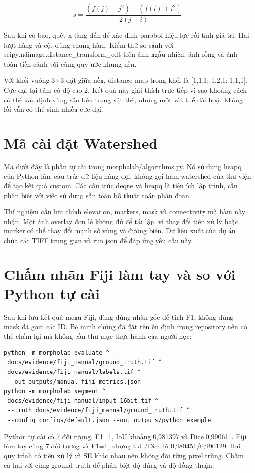 \documentclass[12pt,a4paper,oneside]{report}
\begin{document}
\begin{equation}s=\frac{(f(j)+j^2)-(f(i)+i^2)}{2(j-i)}\end{equation}



Sau khi có bao, quét x tăng dần để xác định parabol hiệu lực rồi tính giá trị. Hai lượt hàng và cột dùng chung hàm. Kiểm thử so sánh với scipy.ndimage.distance\_transform\_edt trên ảnh ngẫu nhiên, ảnh rỗng và ảnh toàn tiền cảnh với cùng quy ước khung nền.

Với khối vuông 3\ensuremath{\times}3 đặt giữa nền, distance map trong khối là [1,1,1; 1,2,1; 1,1,1]. Cực đại tại tâm có độ cao 2. Kết quả này giải thích trực tiếp vì sao khoảng cách có thể xác định vùng sâu bên trong vật thể, nhưng một vật thể dài hoặc không lồi vẫn có thể sinh nhiều cực đại.

\section{Mã cài đặt Watershed}
Mã dưới đây là phần tự cài trong morpholab/algorithms.py. Nó sử dụng heapq của Python làm cấu trúc dữ liệu hàng đợi, không gọi hàm watershed của thư viện để tạo kết quả custom. Các cấu trúc deque và heapq là tiện ích lập trình, cần phân biệt với việc sử dụng sẵn toàn bộ thuật toán phân đoạn.



Thí nghiệm cần lưu chính elevation, markers, mask và connectivity mà hàm này nhận. Một ảnh overlay đơn lẻ không đủ để tái lập, vì thay đổi tiền xử lý hoặc marker có thể thay đổi mạnh số vùng và đường biên. Dữ liệu xuất của dự án chứa các TIFF trung gian và run.json để đáp ứng yêu cầu này.

\section{Chấm nhãn Fiji làm tay và so với Python tự cài}
Sau khi lưu kết quả menu Fiji, dùng đúng nhãn gốc để tính F1, không dùng mask đã gom các ID. Bộ minh chứng đã đặt tên ổn định trong repository nên có thể chấm lại mà không cần thư mục thực hành của người học:
\begin{lstlisting}[language={},numbers=none]
python -m morpholab evaluate ^
 docs/evidence/fiji_manual/ground_truth.tif ^
 docs/evidence/fiji_manual/labels.tif ^
 --out outputs/manual_fiji_metrics.json
python -m morpholab segment ^
 docs/evidence/fiji_manual/input_16bit.tif ^
 --truth docs/evidence/fiji_manual/ground_truth.tif ^
 --config configs/default.json --out outputs/python_example
\end{lstlisting}
Python tự cài có 7 đối tượng, F1=1, IoU khoảng 0,981397 và Dice 0,990611. Fiji làm tay cũng 7 đối tượng và F1=1, nhưng IoU/Dice là 0,980451/0,990129. Hai quy trình có tiền xử lý và SE khác nhau nên không đòi từng pixel trùng. Chấm cả hai với cùng ground truth để phân biệt độ đúng và độ đồng thuận.
\end{document}
